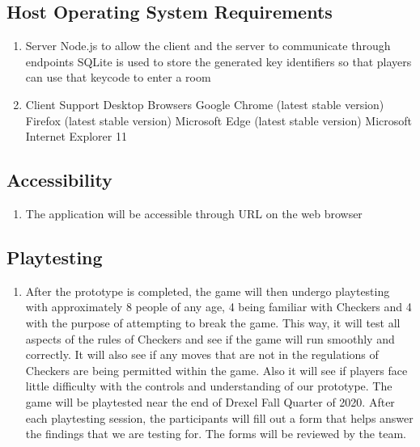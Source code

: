 \documentclass[10pt]{article}
\begin{document}
\subsection{Host Operating System Requirements}

\begin{enumerate}[label*=S\arabic*.]
    \item Server
        \subitem Node.js to allow the client and the server to communicate through endpoints
        \subitem SQLite is used to store the generated key identifiers so that players can use that keycode to enter a room
    \item Client
        \subitem Support Desktop Browsers
            \subsubitem Google Chrome (latest stable version)
            \subsubitem Firefox (latest stable version)
            \subsubitem Microsoft Edge (latest stable version)
            \subsubitem Microsoft Internet Explorer 11
\end{enumerate}

\subsection{Accessibility}

\begin{enumerate}[label*=N\arabic*.]
    \item The application will be accessible through URL on the web browser
\end{enumerate}

\subsection{Playtesting}

\begin{enumerate}[label*=N\arabic*.]
    \item After the prototype is completed, the game will then undergo playtesting with approximately 8 people of any age, 4 being familiar with Checkers and 4 with the purpose of attempting to break the game. This way, it will test all aspects of the rules of Checkers and see if the game will run smoothly and correctly. It will also see if any moves that are not in the regulations of Checkers are being permitted within the game. Also it will see if players face little difficulty with the controls and understanding of our prototype. The game will be playtested near the end of Drexel Fall Quarter of 2020. After each playtesting session, the participants will fill out a form that helps answer the findings that we are testing for. The forms will be reviewed by the team. 
\end{enumerate}
\end{document}
